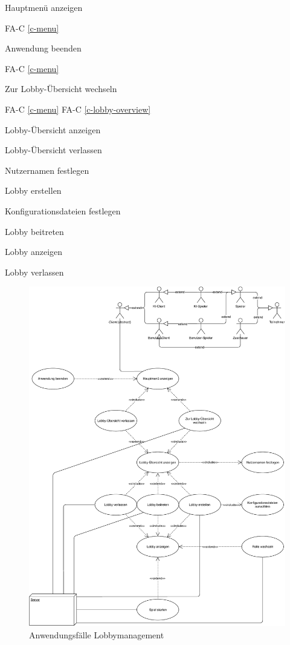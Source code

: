 Hauptmenü anzeigen

FA-C \ref{c-menu} %

Anwendung beenden

FA-C \ref{c-menu} %

Zur Lobby-Übersicht wechseln

FA-C \ref{c-menu} %
FA-C \ref{c-lobby-overview} %

Lobby-Übersicht anzeigen

Lobby-Übersicht verlassen

Nutzernamen festlegen

Lobby erstellen

Konfigurationsdateien festlegen

Lobby beitreten

Lobby anzeigen

Lobby verlassen



\begin{figure}
  \centering
  \includegraphics[width=\textwidth]{Meilenstein02/use_case_lobbymanagement.pdf}
  \caption{Anwendungsfälle Lobbymanagement}
\end{figure}